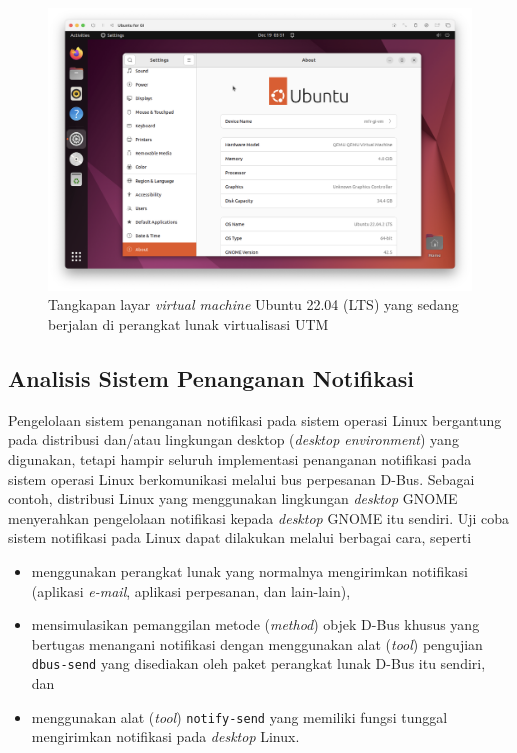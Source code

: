 \begin{figure}[h]
    \centering
    \includegraphics[width=1\linewidth]{assets/Screenshot 2023-12-19 at 10.51.04.png}
    \caption{Tangkapan layar \textit{virtual machine} Ubuntu 22.04 (LTS) yang sedang berjalan di perangkat lunak virtualisasi UTM}
    \label{fig:enter-label}
\end{figure}

\subsection{Analisis Sistem Penanganan Notifikasi}

Pengelolaan sistem penanganan notifikasi pada sistem operasi Linux bergantung pada distribusi dan/atau lingkungan desktop (\textit{desktop environment}) yang digunakan, tetapi hampir seluruh implementasi penanganan notifikasi pada sistem operasi Linux berkomunikasi melalui bus perpesanan D-Bus. Sebagai contoh, distribusi Linux yang menggunakan lingkungan \textit{desktop} GNOME menyerahkan pengelolaan notifikasi kepada \textit{desktop} GNOME itu sendiri. Uji coba sistem notifikasi pada Linux dapat dilakukan melalui berbagai cara, seperti
\begin{itemize}
    \item menggunakan perangkat lunak yang normalnya mengirimkan notifikasi (aplikasi \textit{e-mail}, aplikasi perpesanan, dan lain-lain),
    \item mensimulasikan pemanggilan metode (\textit{method}) objek D-Bus khusus yang bertugas menangani notifikasi dengan menggunakan alat (\textit{tool}) pengujian \verb|dbus-send| yang disediakan oleh paket perangkat lunak D-Bus itu sendiri, dan
    \item menggunakan alat (\textit{tool}) \verb|notify-send| yang memiliki fungsi tunggal mengirimkan notifikasi pada \textit{desktop} Linux.
\end{itemize}

